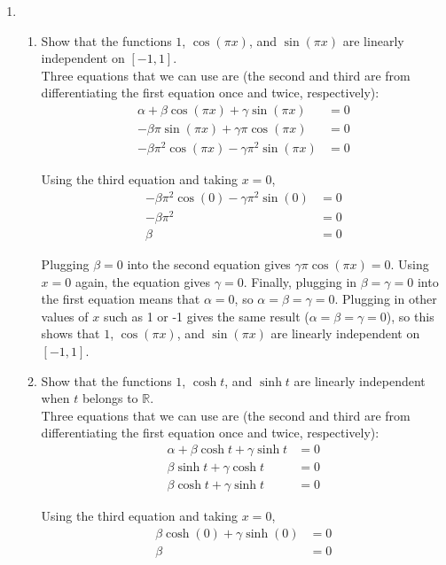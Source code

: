 \documentclass[11pt]{amsart}
\theoremstyle{plain}
\theoremstyle{definition}
\begin{document}
\begin{enumerate}
\bigskip
\item
\begin{enumerate}
\item Show that the functions $1$, $\cos(\pi x)$, and $\sin(\pi x)$ are
linearly independent on $[-1, 1]$. \\

Three equations that we can use are (the second and third are from differentiating the first equation once and twice, respectively):
\begin{align} \nonumber
\alpha + \beta \cos(\pi x) + \gamma \sin(\pi x) &= 0 \\ \nonumber
-\beta \pi \sin(\pi x) + \gamma \pi \cos(\pi x) &= 0 \\ \nonumber
-\beta \pi^2 \cos(\pi x) - \gamma \pi^2 \sin(\pi x) &= 0
\end{align}

Using the third equation and taking $x = 0$, 
\begin{align} \nonumber
-\beta \pi^2 \cos(0) - \gamma \pi^2 \sin(0) &= 0 \\ \nonumber
-\beta \pi^2 &= 0 \\ \nonumber
\beta &= 0
\end{align}

Plugging $\beta = 0$ into the second equation gives $\gamma \pi \cos(\pi x) = 0$. Using $x = 0$ again, the equation gives $\gamma = 0$. Finally, plugging in $\beta = \gamma = 0$ into the first equation means that $\alpha = 0$, so $\alpha = \beta = \gamma = 0$. Plugging in other values of $x$ such as 1 or -1 gives the same result ($\alpha = \beta = \gamma = 0$), so this shows that $1$, $\cos(\pi x)$, and $\sin(\pi x)$ are linearly independent on $[-1, 1]$. \\

\item  Show that the functions $1$, $\cosh t$, and $\sinh t$ are linearly
independent when $t$ belongs to $\mathbb{R}$. \\

Three equations that we can use are (the second and third are from differentiating the first equation once and twice, respectively):
\begin{align} \nonumber
\alpha + \beta \cosh t+ \gamma \sinh t &= 0 \\ \nonumber
\beta \sinh t + \gamma \cosh t &= 0 \\ \nonumber
\beta \cosh t + \gamma \sinh t &= 0
\end{align}

Using the third equation and taking $x = 0$, 
\begin{align} \nonumber
\beta \cosh(0) + \gamma \sinh(0) &= 0 \\ \nonumber
\beta &= 0
\end{align}


\end{enumerate}
\end{enumerate}
\end{document}
